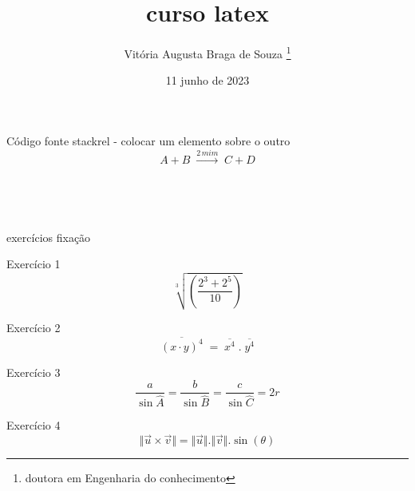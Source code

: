 \documentclass[12pt, a4paper, oneside]{article}
\begin{document}
\vspace{1,0cm}
Código fonte stackrel - colocar um elemento sobre o outro
\begin{equation}
 A + B \;\stackrel{2\,mim}{\longrightarrow}\;C + D
\end{equation}

\newpage

\title{curso latex}\\
\vspace{1,0cm}
\author{Vitória Augusta Braga de Souza \footnote{doutora em Engenharia do conhecimento}}\\
\vspace{1,0cm}
\date{11 junho de 2023}
\maketitle %

exercícios fixação 

Exercício 1
\begin{equation}
\sqrt[3]{\left( \frac{2^{3}+2^{5}}{10}\right) }
\end{equation}
\vspace{1,0cm}

Exercício 2
\begin{equation}
\overline{(x \cdot y)^{4}}\; = \;\overline{x^{4}}\; .\; \overline{y^{4}}
\end{equation}
\vspace{1,0cm}

Exercício 3
\begin{equation}
\frac{a}{\sin\widehat{A}} = \frac{b}{\sin\widehat{B}} = \frac{c}{\sin\widehat{C}} =2r
\end{equation}

\vspace{1,0cm}
Exercício 4
\begin{equation}
\Vert\vec{u} \times  \vec{v}\Vert = \Vert\vec{u}\Vert .\Vert\vec{v}\Vert . \sin(\theta)
\end{equation}
\end{document}
